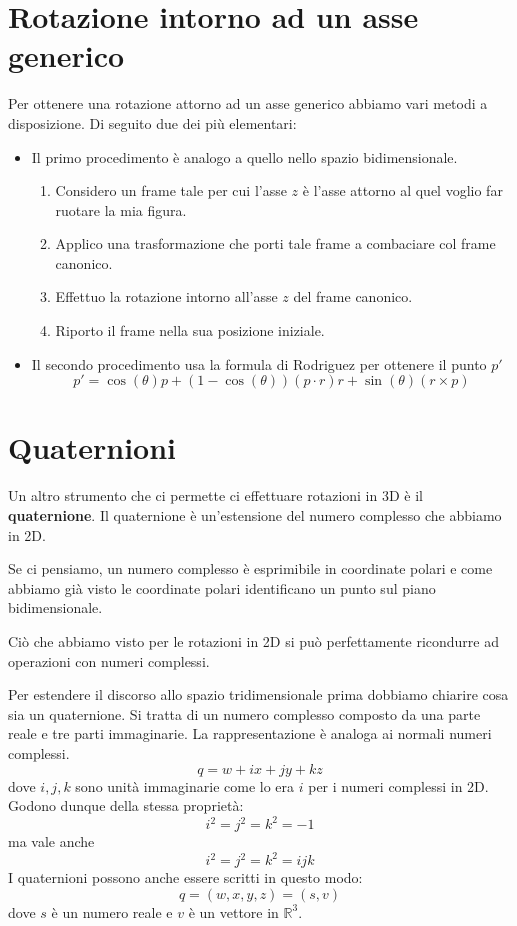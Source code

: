 \section{Rotazione intorno ad un asse generico}
Per ottenere una rotazione attorno ad un asse generico abbiamo vari metodi a disposizione. Di seguito due dei pi\`u
elementari:
\begin{itemize}
	\item Il primo procedimento \`e analogo a quello nello spazio bidimensionale.
	      \begin{enumerate}
		      \item Considero un frame tale per cui l'asse $z$ \`e l'asse attorno al quel voglio far ruotare la mia
		            figura.
		      \item Applico una trasformazione che porti tale frame a combaciare col frame canonico.
		      \item Effettuo la rotazione intorno all'asse $z$ del frame canonico.
		      \item Riporto il frame nella sua posizione iniziale.
	      \end{enumerate}
	\item Il secondo procedimento usa la formula di Rodriguez per ottenere il punto $p'$
	      \[ p' = \cos(\theta) p + (1 - \cos(\theta))(p \cdot r) r + \sin(\theta)(r \times p) \]
\end{itemize}

\section{Quaternioni}
Un altro strumento che ci permette ci effettuare rotazioni in 3D \`e il \textbf{quaternione}. Il quaternione \`e
un'estensione del numero complesso che abbiamo in 2D.

Se ci pensiamo, un numero complesso \`e esprimibile in coordinate polari e come abbiamo gi\`a visto le coordinate polari
identificano un punto sul piano bidimensionale.

Ci\`o che abbiamo visto per le rotazioni in 2D si pu\`o perfettamente ricondurre ad operazioni con numeri complessi.

Per estendere il discorso allo spazio tridimensionale prima dobbiamo chiarire cosa sia un quaternione. Si tratta di un
numero complesso composto da una parte reale e tre parti immaginarie. La rappresentazione \`e analoga ai normali numeri
complessi.
\[ q = w + ix + jy + kz \]
dove $i, j, k$ sono unit\`a immaginarie come lo era $i$ per i numeri complessi in 2D. Godono dunque della stessa
propriet\`a:
\[ i^2 = j^2 = k^2 = -1 \]
ma vale anche
\[ i^2 = j^2 = k^2 = ijk \]
I quaternioni possono anche essere scritti in questo modo:
\[ q = (w, x, y, z) = (s, v) \]
dove $s$ \`e un numero reale e $v$ \`e un vettore in $\mathbb{R}^3$.

